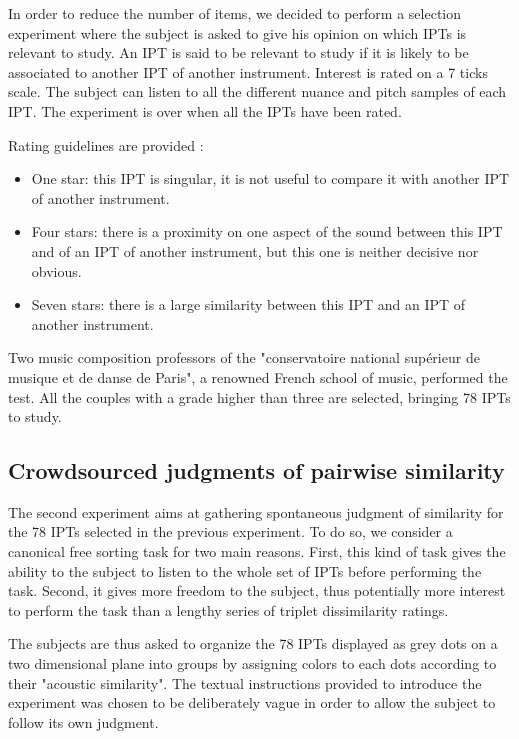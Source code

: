 \documentclass{article}
\newcommand{\ipt}{IPT\xspace}
\newcommand{\ipts}{IPTs\xspace}
\begin{document}
In order to reduce the number of items, we decided to perform a selection experiment where the subject is asked to give his opinion on which \ipts is relevant to study. An \ipt is said to be relevant to study if it is likely to be associated to another \ipt of another instrument. Interest is rated on a 7 ticks scale. The subject can listen to all the different nuance and pitch samples of each \ipt. The experiment is over when all the \ipts have been rated.

Rating guidelines are provided :
\begin{itemize}
  \item One star: this \ipt is singular, it is not useful to compare it with another \ipt of another instrument.
  \item Four stars: there is a proximity on one aspect of the sound between this \ipt and of an \ipt of another instrument, but this one is neither decisive nor obvious.
  \item Seven stars: there is a large similarity between this \ipt and an \ipt of another instrument.
\end{itemize}

Two music composition professors of the "conservatoire national sup\'erieur de musique et de danse de Paris", a renowned French school of music, performed the test. All the couples with a grade higher than three are selected, bringing 78 \ipts to study.



\subsection{Crowdsourced judgments of pairwise similarity}

The second experiment aims at gathering spontaneous judgment of similarity for the 78 \ipts selected in the previous experiment. To do so, we consider a canonical free sorting task for two main reasons. First, this kind of task gives the ability to the subject to listen to the whole set of \ipts before performing the task. Second, it gives more freedom to the subject, thus potentially more interest to perform the task than a lengthy series of triplet dissimilarity ratings.

The subjects are thus asked to organize the 78 \ipts displayed as grey dots on a two dimensional plane into groups by assigning colors to each dots according to their "acoustic similarity". The textual instructions provided to introduce the experiment was chosen to be deliberately vague in order to allow the subject to follow its own judgment.
\end{document}
